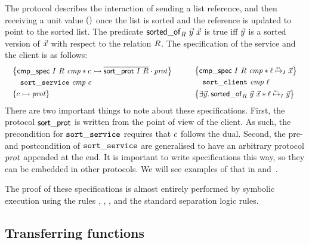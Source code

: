 \noindent
The protocol describes the interaction of sending a list reference, and then
receiving a unit value $()$ once the list is sorted and the reference is
updated to point to the sorted list.
The predicate $\mathsf{sorted\_of}_{R}\ \vec{y}\ \vec{x}$
is true iff $\vec{y}$ is a sorted version of $\vec{x}$ with respect to
the relation $R$.
The specification of the service and the client is as follows:
\[
\begin{array}{c !{\quad} c}
\begin{array}{l}
  \hoareV
    {\cmpspecname\ \interpvar\ \relvar\ \cmpvar *
     \interp{\chan}{\protapp{\dual{\listsortprotname\ \interpvar\ \relvar}} \prot}}
    {\listsortservicename\ \cmpvar\ \chan}
    {\interp{\chan}{\prot}}
\end{array}
  &
\begin{array}{l}
  \hoareV
    {\cmpspecname\ \interpvar\ \relvar\ \cmpvar *
     \listrefI \interpvar \loc {\vec\var}}
    {\listsortclientname\ \cmpvar\ \loc}
    {\Exists \vec\varB.
     \sortedof {\vec\varB} {\vec\var} \relvar *
     \listrefI \interpvar \loc {\vec\varB}}
\end{array}
\end{array}
\]
\noindent
There are two important things to note about these specifications.
First, the protocol $\mathsf{sort\_prot}$ is written from the point of view
of the client.
As such, the precondition for $\mathtt{sort\_service}$ requires that $c$
follows the dual.
Second, the pre- and postcondition of $\mathtt{sort\_service}$ are generalised
to have an arbitrary protocol $\mathit{prot}$ appended at the end.
It is important to write specifications this way, so they can be embedded in
other protocols.
We will see examples of that in  and~.

The proof of these specifications is almost entirely performed by symbolic
execution using the rules , ,
, and the standard separation logic rules.

\subsection{Transferring functions}
\label{sec:functions}

